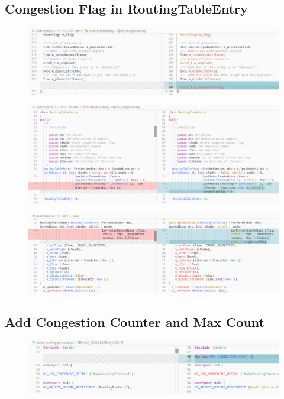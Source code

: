 \documentclass[12pt, a4paper]{article}
\begin{document}
\subsection{Congestion Flag in RoutingTableEntry}
\begin{figure}[H]
\centering
\includegraphics[scale = 0.4]{images/cc-aodv/aodv-01.png}

\end{figure}
\begin{figure}[H]
\centering
\includegraphics[scale = 0.4]{images/cc-aodv/aodv-02.png}

\end{figure}
\begin{figure}[H]
\centering
\includegraphics[scale = 0.4]{images/cc-aodv/aodv-03.png}

\end{figure}
\subsection{Add Congestion Counter and Max Count}
\begin{figure}[H]
\centering
\includegraphics[scale = 0.4]{images/cc-aodv/aodv-04.png}
\end{figure}
\end{document}
